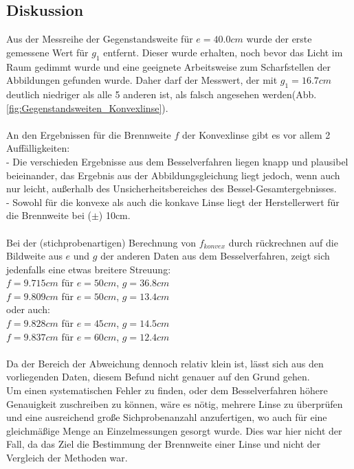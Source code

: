 \documentclass[12pt,a4paper]{article}
\begin{document}
\begin{multicols}{2}
\subsection{Diskussion}
Aus der Messreihe der Gegenstandsweite für $e=40.0cm$ wurde der erste gemessene Wert für $g_1$ entfernt. Dieser wurde erhalten, noch bevor das Licht im Raum gedimmt wurde und eine geeignete Arbeitsweise zum Scharfstellen der Abbildungen gefunden wurde. Daher darf der Messwert, der mit $g_1 = 16.7 cm$ deutlich niedriger als alle 5 anderen ist, als falsch angesehen werden(Abb. \ref{fig:Gegenstandsweiten_Konvexlinse}).\\
\\
An den Ergebnissen für die Brennweite $f$ der Konvexlinse gibt es vor allem 2 Auffälligkeiten:\\
- Die verschieden Ergebnisse aus dem Besselverfahren liegen knapp und plausibel beieinander, das Ergebnis aus der Abbildungsgleichung liegt jedoch, wenn auch nur leicht, außerhalb des Unsicherheitsbereiches des Bessel-Gesamtergebnisses.\\
- Sowohl für die konvexe als auch die konkave Linse liegt der Herstellerwert für die Brennweite bei ($\pm$) 10cm.\\
\\
Bei der (stichprobenartigen) Berechnung von $f_{konvex}$ durch rückrechnen auf die Bildweite aus $e$ und $g$ der anderen Daten aus dem Besselverfahren, zeigt sich jedenfalls eine etwas breitere Streuung:\\
$f = 9.715cm$ für $e=50cm$, $g=36.8cm$\\
$f=9.809cm$ für $e=50cm$, $g=13.4cm$\\
oder auch:\\
$f=9.828cm$ für $e=45cm$, $g=14.5cm$\\
$f=9.837cm$ für $e=60cm$, $g=12.4cm$\\
\\
Da der Bereich der Abweichung dennoch relativ klein ist, lässt sich aus den vorliegenden Daten, diesem Befund nicht genauer auf den Grund gehen.\\
Um einen systematischen Fehler zu finden, oder dem Besselverfahren höhere Genauigkeit zuschreiben zu können, wäre es nötig, mehrere Linse zu überprüfen und eine ausreichend große Sichprobenanzahl anzufertigen, wo auch für eine gleichmäßige Menge an Einzelmessungen gesorgt wurde. Dies war hier nicht der Fall, da das Ziel die Bestimmung der Brennweite einer Linse und nicht der Vergleich der Methoden war.\\
\\

\end{multicols}
\end{document}

